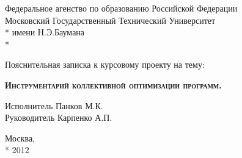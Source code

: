 \begin{titlepage}
    \newpage
    
    \begin{center}
        Федеральное агенство по образованию Российской Федерации \\
        Московский Государственный Технический Университет \\*
        имени Н.Э.Баумана \\*
        \vspace{-12mm}
        \begin{figure}[h]
        \end{figure}
        \vspace{-16mm}
        \hrulefill
    \end{center}
    \begin{center}
        \Large Пояснительная записка к курсовому проекту на тему:
    \end{center}
    
    \vspace{2.5em}
    
    \begin{center}
        \textsc{\textbf{Инструментарий коллективной оптимизации программ.}}
    \end{center}
    
    \vspace{6em}
    
    \begin{flushleft}
        \hspace{8.5cm}Исполнитель \hrulefill Панков М.К. \\
        \vspace{1.5em}
        \hspace{8.5cm}Руководитель \hrulefill Карпенко А.П.\\
    \end{flushleft}
    
    \vspace{\fill}
    
    \begin{center}
        Москва, \\*
        2012
    \end{center}

\end{titlepage}